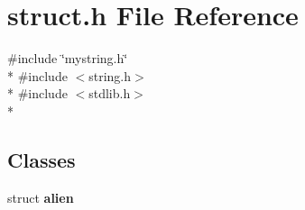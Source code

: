 \section{struct.\-h File Reference}
\label{struct_8h}
{\ttfamily \#include \char`\"{}mystring.\-h\char`\"{}}\\*
{\ttfamily \#include $<$string.\-h$>$}\\*
{\ttfamily \#include $<$stdlib.\-h$>$}\\*
\subsection*{Classes}
\begin{DoxyCompactItemize}
\item 
struct {\bf alien}
\end{DoxyCompactItemize}
